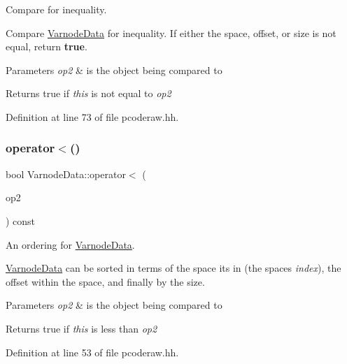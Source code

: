 Compare for inequality. 

Compare \mbox{\hyperlink{struct_varnode_data}{Varnode\+Data}} for inequality. If either the space, offset, or size is not equal, return {\bfseries{true}}. 
\begin{DoxyParams}{Parameters}
{\em op2} & is the object being compared to \\
\hline
\end{DoxyParams}
\begin{DoxyReturn}{Returns}
true if {\itshape this} is not equal to {\itshape op2} 
\end{DoxyReturn}


Definition at line 73 of file pcoderaw.\+hh.

\mbox{\label{struct_varnode_data_ac453e3030db573d022069a80e09ea485}} 
\subsubsection{\texorpdfstring{operator$<$()}{operator<()}}
{\footnotesize\ttfamily bool Varnode\+Data\+::operator$<$ (\begin{DoxyParamCaption}\item[{const \mbox{\hyperlink{struct_varnode_data}{Varnode\+Data}} \&}]{op2 }\end{DoxyParamCaption}) const\hspace{0.3cm}{\ttfamily [inline]}}



An ordering for \mbox{\hyperlink{struct_varnode_data}{Varnode\+Data}}. 

\mbox{\hyperlink{struct_varnode_data}{Varnode\+Data}} can be sorted in terms of the space its in (the space\textquotesingle{}s {\itshape index}), the offset within the space, and finally by the size. 
\begin{DoxyParams}{Parameters}
{\em op2} & is the object being compared to \\
\hline
\end{DoxyParams}
\begin{DoxyReturn}{Returns}
true if {\itshape this} is less than {\itshape op2} 
\end{DoxyReturn}


Definition at line 53 of file pcoderaw.\+hh.

